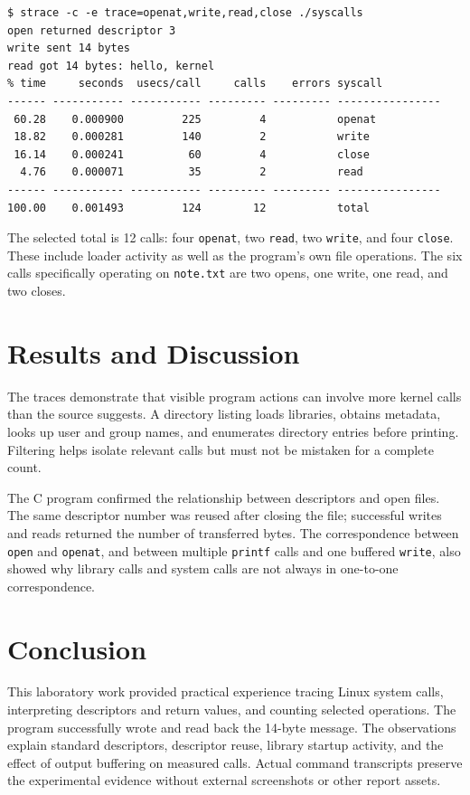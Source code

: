 \documentclass[12pt,a4paper]{article}
\begin{document}
\begin{lstlisting}[caption={Summary of the four selected calls for the program}]
$ strace -c -e trace=openat,write,read,close ./syscalls
open returned descriptor 3
write sent 14 bytes
read got 14 bytes: hello, kernel
% time     seconds  usecs/call     calls    errors syscall
------ ----------- ----------- --------- --------- ----------------
 60.28    0.000900         225         4           openat
 18.82    0.000281         140         2           write
 16.14    0.000241          60         4           close
  4.76    0.000071          35         2           read
------ ----------- ----------- --------- --------- ----------------
100.00    0.001493         124        12           total
\end{lstlisting}

The selected total is 12 calls: four \texttt{openat}, two \texttt{read}, two
\texttt{write}, and four \texttt{close}. These include loader activity as well as
the program's own file operations. The six calls specifically operating on
\texttt{note.txt} are two opens, one write, one read, and two closes.

\section{Results and Discussion}
The traces demonstrate that visible program actions can involve more kernel calls
than the source suggests. A directory listing loads libraries, obtains metadata,
looks up user and group names, and enumerates directory entries before printing.
Filtering helps isolate relevant calls but must not be mistaken for a complete
count.

The C program confirmed the relationship between descriptors and open files.
The same descriptor number was reused after closing the file; successful writes
and reads returned the number of transferred bytes. The correspondence between
\texttt{open} and \texttt{openat}, and between multiple \texttt{printf} calls and
one buffered \texttt{write}, also showed why library calls and system calls are
not always in one-to-one correspondence.

\section{Conclusion}
This laboratory work provided practical experience tracing Linux system calls,
interpreting descriptors and return values, and counting selected operations.
The program successfully wrote and read back the 14-byte message. The observations
explain standard descriptors, descriptor reuse, library startup activity, and the
effect of output buffering on measured calls. Actual command transcripts preserve
the experimental evidence without external screenshots or other report assets.
\end{document}
